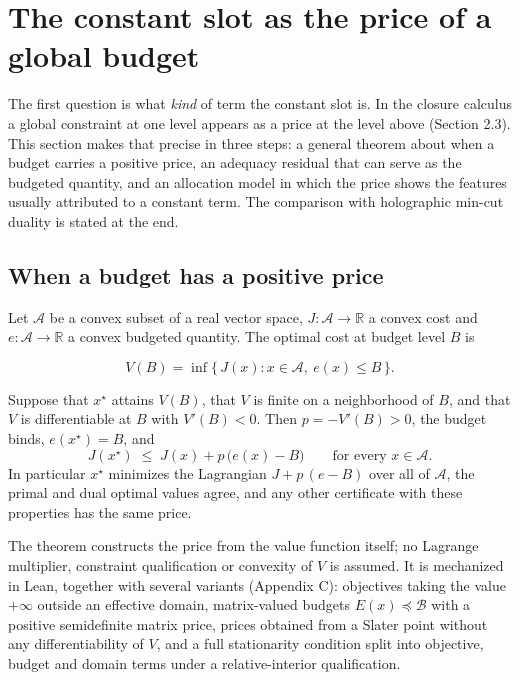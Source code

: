 \hypertarget{the-constant-slot-as-the-price-of-a-global-budget}{%
\section{The constant slot as the price of a global
budget}\label{the-constant-slot-as-the-price-of-a-global-budget}}

The first question is what \emph{kind} of term the constant slot is. In
the closure calculus a global constraint at one level appears as a price
at the level above (Section 2.3). This section makes that precise in
three steps: a general theorem about when a budget carries a positive
price, an adequacy residual that can serve as the budgeted quantity, and
an allocation model in which the price shows the features usually
attributed to a constant term. The comparison with holographic min-cut
duality is stated at the end.

\hypertarget{when-a-budget-has-a-positive-price}{%
\subsection{When a budget has a positive
price}\label{when-a-budget-has-a-positive-price}}

Let \(\mathcal A\) be a convex subset of a real vector space,
\(J:\mathcal A\to\mathbb R\) a convex cost and
\(e:\mathcal A\to\mathbb R\) a convex budgeted quantity. The optimal
cost at budget level \(B\) is

\[V(B)=\inf\{\,J(x) : x\in\mathcal A,\ e(x)\le B\,\}.\]

\begin{theorem}\label{thm:price}
Suppose that $x^\star$ attains $V(B)$, that $V$ is finite on a neighborhood of $B$, and that $V$ is differentiable at
$B$ with $V'(B)<0$. Then $p=-V'(B)>0$, the budget binds, $e(x^\star)=B$, and
$$J(x^\star)\;\le\;J(x)+p\,\bigl(e(x)-B\bigr)\qquad\text{for every }x\in\mathcal A .$$
In particular $x^\star$ minimizes the Lagrangian $J+p\,(e-B)$ over all of $\mathcal A$, the primal and dual optimal
values agree, and any other certificate with these properties has the same price.
\end{theorem}

The theorem constructs the price from the value function itself; no
Lagrange multiplier, constraint qualification or convexity of \(V\) is
assumed. It is mechanized in Lean, together with several variants
(Appendix C): objectives taking the value \(+\infty\) outside an
effective domain, matrix-valued budgets \(E(x)\preceq\mathcal B\) with a
positive semidefinite matrix price, prices obtained from a Slater point
without any differentiability of \(V\), and a full stationarity
condition split into objective, budget and domain terms under a
relative-interior qualification.

